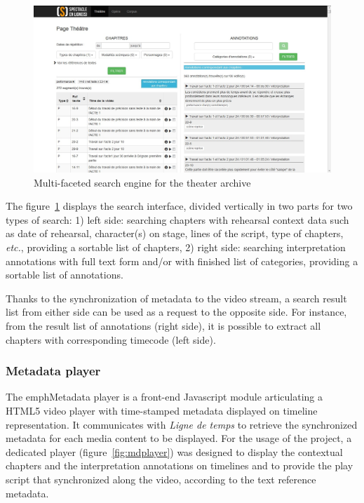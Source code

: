 \documentclass[conference]{IEEEtran}
\begin{document}
\begin{figure}[htb!]
  \centering
  \includegraphics[width=\columnwidth]{searchengine}
  \caption{Multi-faceted search engine for the theater archive}
  \label{fig:searchengine}
\end{figure}

The figure~\ref{fig:searchengine} displays the search interface, divided vertically in two parts for two types of search:
1) left side: searching chapters with rehearsal context data such as date of rehearsal, character(s) on stage, lines of the script, type of chapters, \emph{etc.}, providing a sortable list of chapters,
2) right side: searching interpretation annotations with full text form and/or with finished list of categories, providing a sortable list of annotations.

Thanks to the synchronization of metadata to the video stream, a search result list from either side can be used as a request to the opposite side. For instance, from the result list of annotations (right side), it is possible to extract all chapters with corresponding timecode (left side).

\subsubsection{Metadata player}
The emph{Metadata player} is a front-end Javascript module articulating a HTML5 video player with time-stamped metadata displayed on timeline representation. It communicates with \emph{Ligne de temps} to retrieve the synchronized metadata for each media content to be displayed. For the usage of the project, a dedicated player (figure~\ref{fig:mdplayer}) was designed to display the contextual chapters and the interpretation annotations on timelines and to provide the play script that synchronized along the video, according to the text reference metadata.
\end{document}
